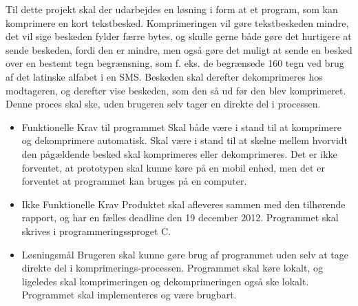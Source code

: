 Til dette projekt skal der udarbejdes en løsning i form at et program, som kan komprimere en kort tekstbesked. Komprimeringen vil gøre tekstbeskeden mindre, det vil sige beskeden fylder færre bytes, og skulle gerne både gøre det hurtigere at sende beskeden, fordi den er mindre, men også gøre det muligt at sende en besked over en bestemt tegn begrænsning, som f. eks. de begrænsede 160 tegn ved brug af det latinske alfabet i en SMS. Beskeden skal derefter dekomprimeres hos modtageren, og derefter vise beskeden, som den så ud før den blev komprimeret. Denne proces skal ske, uden brugeren selv tager en direkte del i processen.

\begin {itemize}
\item Funktionelle Krav til programmet
\subitem Skal både være i stand til at komprimere og dekomprimere automatisk.
\subitem Skal være i stand til at skelne mellem hvorvidt den pågældende besked skal komprimeres eller dekomprimeres.
\subitem Det er ikke forventet, at prototypen skal kunne køre på en mobil enhed, men det er forventet at programmet kan bruges på en computer.

\item Ikke Funktionelle Krav
\subitem Produktet skal afleveres sammen med den tilhørende rapport, og har en fælles deadline den 19 december 2012.
\subitem Programmet skal skrives i programmeringssproget C.

\item Løsningsmål
\subitem Brugeren skal kunne gøre brug af programmet uden selv at tage direkte del i komprimerings-processen.
\subitem Programmet skal køre lokalt, og ligeledes skal komprimeringen og dekomprimeringen også ske lokalt.
\subitem Programmet skal implementeres og være brugbart.
\end{itemize}
